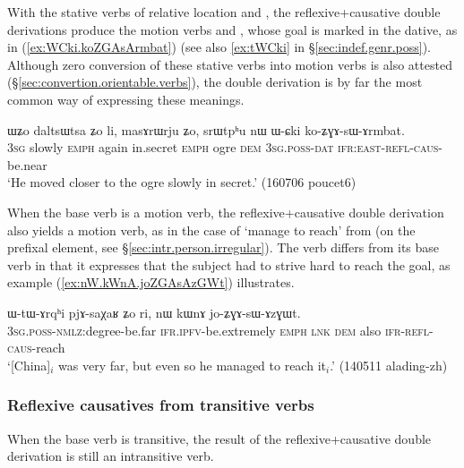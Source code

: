 With the stative verbs of relative location  and  , the reflexive+causative double derivations produce the motion verbs  and , whose goal is marked in the dative, as in (\ref{ex:WCki.koZGAsArmbat}) (see also \ref{ex:tWCki} in §\ref{sec:indef.genr.poss}). Although zero conversion of these stative verbs into motion verbs is also attested (§\ref {sec:convertion.orientable.verbs}), the double derivation is by far the most common way of expressing these meanings.

\begin{exe}
\ex \label{ex:WCki.koZGAsArmbat}
\gll ɯʑo daltsɯtsa ʑo li, masɤrɯrju ʑo, srɯtpʰu nɯ ɯ-ɕki ko-ʑɣɤ-sɯ-ɤrmbat. \\
\textsc{3sg} slowly \textsc{emph} again in.secret \textsc{emph} ogre \textsc{dem} \textsc{3sg}.\textsc{poss}-\textsc{dat} \textsc{ifr}:\textsc{east}-\textsc{refl}-\textsc{caus}-be.near \\
\glt `He moved closer to the ogre slowly in secret.'  (160706 poucet6)
\end{exe}

   
When the base verb is a motion verb, the reflexive+causative double derivation also yields a motion verb, as in the case of   `manage to reach' from  (on the  prefixal element, see §\ref{sec:intr.person.irregular}). The verb  differs from its base verb in that it expresses that the subject  had to strive hard to reach the goal, as example (\ref{ex:nW.kWnA.joZGAsAzGWt}) illustrates.

\begin{exe}
\ex \label{ex:nW.kWnA.joZGAsAzGWt}
\gll ɯ-tɯ-ɤrqʰi pjɤ-saχaʁ ʑo ri, nɯ kɯnɤ jo-ʑɣɤ-sɯ-ɤzɣɯt. \\
\textsc{3sg}.\textsc{poss}-\textsc{nmlz}:degree-be.far \textsc{ifr}.\textsc{ipfv}-be.extremely \textsc{emph} \textsc{lnk} \textsc{dem} also \textsc{ifr}-\textsc{refl}-\textsc{caus}-reach \\
\glt `[China]$_i$ was very far, but even so he managed to reach it$_i$.' (140511 alading-zh) 
\end{exe}
\subsubsection{Reflexive  causatives from transitive verbs}
When the base verb is transitive, the result of the reflexive+causative double derivation is still an intransitive verb. 


